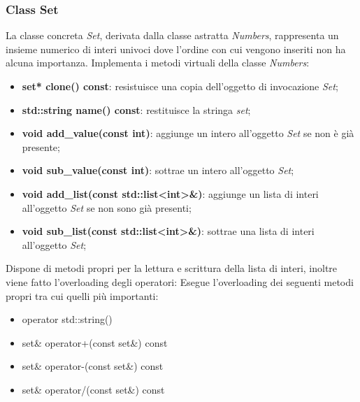 \documentclass[a4paper,10pt]{article}
\begin{document}
        \subsubsection{Class Set}
        La classe concreta \textit{Set}, derivata dalla classe astratta \textit{Numbers}, rappresenta un insieme numerico di interi univoci dove l’ordine con cui vengono inseriti non ha alcuna importanza. 
        Implementa i metodi virtuali della classe \textit{Numbers}:
        \begin{itemize}
            \item \textbf{set* clone() const}: resistuisce una copia dell'oggetto di invocazione \textit{Set};
            \item \textbf{std::string name() const}: restituisce la stringa \textit{set};
            \item \textbf{void add\_value(const int)}: aggiunge un intero all'oggetto \textit{Set} se non è già presente;
            \item \textbf{void sub\_value(const int)}: sottrae un intero all'oggetto \textit{Set};
            \item \textbf{void add\_list(const std::list<int>\&)}: aggiunge un lista di interi all'oggetto \textit{Set} se non sono già presenti;
            \item \textbf{void sub\_list(const std::list<int>\&)}: sottrae una lista di interi all'oggetto \textit{Set};
        \end{itemize}
        Dispone di metodi propri per la lettura e scrittura della lista di interi, inoltre viene fatto l'overloading  degli operatori:
        Esegue l'overloading dei seguenti metodi propri tra cui  quelli più importanti:
        \begin{itemize}
            \item operator std::string()
            \item set\& operator+(const set\&) const
            \item set\& operator-(const set\&) const
            \item set\& operator/(const set\&) const
        \end{itemize}
    
\end{document}
